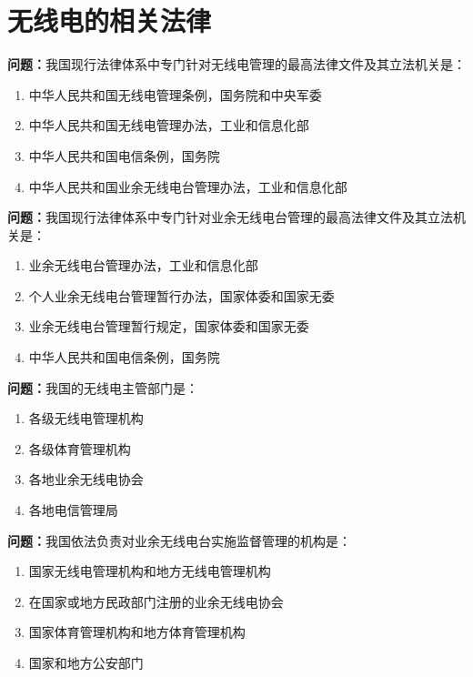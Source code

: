 \chapter{无线电的相关法律}





\noindent\textbf{问题：}我国现行法律体系中专门针对无线电管理的最高法律文件及其立法机关是：
\begin{enumerate}[label=\Alph*), leftmargin=3em]
\item 中华人民共和国无线电管理条例，国务院和中央军委
\item 中华人民共和国无线电管理办法，工业和信息化部
\item 中华人民共和国电信条例，国务院
\item 中华人民共和国业余无线电台管理办法，工业和信息化部
\end{enumerate}

\bigskip


\noindent\textbf{问题：}我国现行法律体系中专门针对业余无线电台管理的最高法律文件及其立法机关是：
\begin{enumerate}[label=\Alph*), leftmargin=3em]
\item 业余无线电台管理办法，工业和信息化部
\item 个人业余无线电台管理暂行办法，国家体委和国家无委
\item 业余无线电台管理暂行规定，国家体委和国家无委
\item 中华人民共和国电信条例，国务院
\end{enumerate}

\bigskip


\noindent\textbf{问题：}我国的无线电主管部门是：
\begin{enumerate}[label=\Alph*), leftmargin=3em]
\item 各级无线电管理机构
\item 各级体育管理机构
\item 各地业余无线电协会
\item 各地电信管理局
\end{enumerate}

\bigskip


\noindent\textbf{问题：}我国依法负责对业余无线电台实施监督管理的机构是：
\begin{enumerate}[label=\Alph*), leftmargin=3em]
\item 国家无线电管理机构和地方无线电管理机构
\item 在国家或地方民政部门注册的业余无线电协会
\item 国家体育管理机构和地方体育管理机构
\item 国家和地方公安部门
\end{enumerate}


